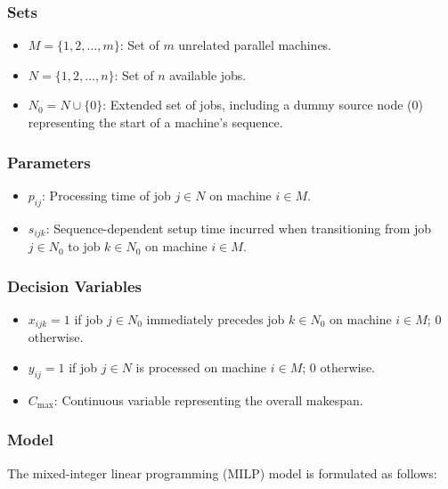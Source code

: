 \documentclass{article}
\begin{document}
\subsubsection{Sets}

\begin{itemize}
    \item $M = \{1, 2, \ldots, m\}$: Set of $m$ unrelated parallel machines.
    \item $N = \{1, 2, \ldots, n\}$: Set of $n$ available jobs.
    \item $N_0 = N \cup \{0\}$: Extended set of jobs, including a dummy source node ($0$) representing the start of a machine's sequence.
\end{itemize}

\subsubsection{Parameters}

\begin{itemize}
    \item $p_{ij}$: Processing time of job $j \in N$ on machine $i \in M$.
    \item $s_{ijk}$: Sequence-dependent setup time incurred when transitioning from job $j \in N_0$ to job $k \in N_0$ on machine $i \in M$.
\end{itemize}

\subsubsection{Decision Variables}

\begin{itemize}
    \item $x_{ijk} = 1$ if job $j \in N_0$ immediately precedes job $k \in N_0$ on machine $i \in M$; $0$ otherwise.
    \item $y_{ij} = 1$ if job $j \in N$ is processed on machine $i \in M$; $0$ otherwise.
    \item $C_{\max}$: Continuous variable representing the overall makespan.
\end{itemize}

\subsubsection{Model}

The mixed-integer linear programming (MILP) model is formulated as follows:
\end{document}
